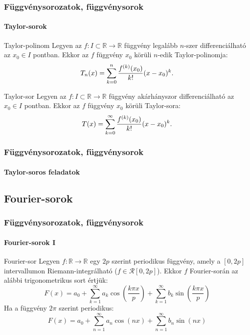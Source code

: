 \begin{frame}
  \frametitle{Függvénysorozatok, függvénysorok}
  \framesubtitle{Taylor-sorok}

  \begin{block}{Taylor-polinom}
    Legyen az $f : I \subset \mathbb R \rightarrow \mathbb R$ függvény legalább
    $n$-szer differenciálható az $x_0 \in I$ pontban. Ekkor az $f$ függvény
    $x_0$ körüli $n$-edik Taylor-polinomja:
    \[
      T_n(x)
      = \sum_{k = 0}^n
      \frac{f^{(k)}(x_0)}{k!}
      (x - x_0)^k
      \text.
    \]
  \end{block}

  \begin{block}{Taylor-sor}
    Legyen az $f : I \subset \mathbb R \rightarrow \mathbb R$ függvény
    akárhányszor differenciálható az $x_0 \in I$ pontban. Ekkor az $f$ függvény
    $x_0$ körüli Taylor-sora:
    \[
      T(x)
      = \sum_{k = 0}^\infty
      \frac{f^{(k)}(x_0)}{k!}
      (x - x_0)^k
      \text.
    \]
  \end{block}
\end{frame}

\begin{frame}
  \frametitle{Függvénysorozatok, függvénysorok}
  \framesubtitle{Taylor-soros feladatok}

  
  
\end{frame}

\subsection{Fourier-sorok}

\begin{frame}
  \frametitle{Függvénysorozatok, függvénysorok}
  \framesubtitle{Fourier-sorok I}

  \begin{block}{Fourier-sor}
    Legyen $f : \mathbb R \rightarrow \mathbb R$ egy $2p$ szerint periodikus
    függvény, amely a $[0,2p]$ intervallumon Riemann-integrálható ($f \in
      \mathcal R [0, 2p]$). Ekkor $f$ Fourier-során az alábbi trigonometrikus
    sort értjük:
    \[
      F(x)
      = a_0
      + \sum_{k = 1}^\infty a_k \cos \left( \frac{k \pi x}{p} \right)
      + \sum_{k = 1}^\infty b_k \sin \left( \frac{k \pi x}{p} \right)
    \]
    Ha a függvény $2 \pi$ szerint periodikus:
    \[
      F(x)
      = a_0
      + \sum_{n = 1}^\infty a_n \cos (nx)
      + \sum_{n = 1}^\infty b_n \sin (nx)
    \]
  \end{block}
\end{frame}

